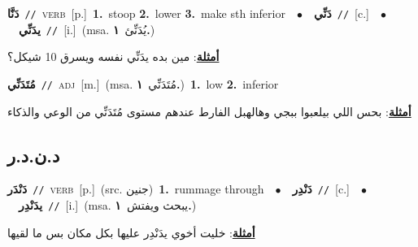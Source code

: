 \documentclass[10pt,a4paper,twoside]{article} %
\begin{document}
\begin{multicols}{2}
{\setlength\topsep{0pt}\textbf{\foreignlanguage{arabic}{دَنَّا}}\ {\color{gray}\texttt{//}\color{black}}\ \textsc{verb}\ [p.]\ \textbf{1.}~stoop  \textbf{2.}~lower  \textbf{3.}~make sth inferior\ \ $\bullet$\ \ \setlength\topsep{0pt}\textbf{\foreignlanguage{arabic}{دَنِّي}}\ {\color{gray}\texttt{//}\color{black}}\ [c.]\ \ $\bullet$\ \ \setlength\topsep{0pt}\textbf{\foreignlanguage{arabic}{يدَنِّي}}\ {\color{gray}\texttt{//}\color{black}}\ [i.]\ \color{gray}(msa. \foreignlanguage{arabic}{يُدَنِّئ}~\foreignlanguage{arabic}{\textbf{١.}})\color{black}\  \begin{flushright}\color{gray}\foreignlanguage{arabic}{\textbf{\underline{\foreignlanguage{arabic}{أمثلة}}}: مين بده يدَنِّي نفسه ويسرق 10 شيكل؟}\end{flushright}\color{black}} \vspace{2mm}

{\setlength\topsep{0pt}\textbf{\foreignlanguage{arabic}{مُتَدَنِّي}}\ {\color{gray}\texttt{//}\color{black}}\ \textsc{adj}\ [m.]\ \color{gray}(msa. \foreignlanguage{arabic}{مُتَدَنِّي}~\foreignlanguage{arabic}{\textbf{١.}})\color{black}\ \textbf{1.}~low  \textbf{2.}~inferior\  \begin{flushright}\color{gray}\foreignlanguage{arabic}{\textbf{\underline{\foreignlanguage{arabic}{أمثلة}}}: بحس اللي بيلعبوا ببجي وهالهبل الفارط عندهم مستوى مُتَدَنِّي من الوعي والذكاء}\end{flushright}\color{black}} \vspace{2mm}

\vspace{-3mm}
\subsection*{\color{blue}\foreignlanguage{arabic}{د.ن.د.ر}\color{blue}{}} 

{\setlength\topsep{0pt}\textbf{\foreignlanguage{arabic}{دَنْدَر}}\ {\color{gray}\texttt{//}\color{black}}\ \textsc{verb}\ [p.]\ (src. \color{gray}\foreignlanguage{arabic}{جنين}\color{black})\ \textbf{1.}~rummage through\ \ $\bullet$\ \ \setlength\topsep{0pt}\textbf{\foreignlanguage{arabic}{دَنْدِر}}\ {\color{gray}\texttt{//}\color{black}}\ [c.]\ \ $\bullet$\ \ \setlength\topsep{0pt}\textbf{\foreignlanguage{arabic}{يدَنْدِر}}\ {\color{gray}\texttt{//}\color{black}}\ [i.]\ \color{gray}(msa. \foreignlanguage{arabic}{يبحث ويفتش}~\foreignlanguage{arabic}{\textbf{١.}})\color{black}\  \begin{flushright}\color{gray}\foreignlanguage{arabic}{\textbf{\underline{\foreignlanguage{arabic}{أمثلة}}}: خليت أخوي يدَنْدِر عليها بكل مكان بس ما لقيها}\end{flushright}\color{black}} \vspace{2mm}


\end{multicols}
\end{document}
